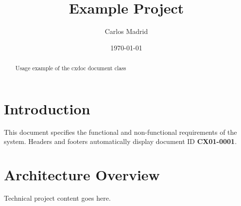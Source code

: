 \documentclass{cxdoc}
\title{Example Project}
\author{Carlos Madrid}
\date{\today}
\begin{document}
\maketitle

\begin{abstract}
Usage example of the cxdoc document class
\end{abstract}

\tableofcontents
\newpage

\section{Introduction}

This document specifies the functional and non-functional requirements of the
system. Headers and footers automatically display document ID
\textbf{CX01-0001}.

\section{Architecture Overview}

Technical project content goes here.

\makebackcover
\end{document}
